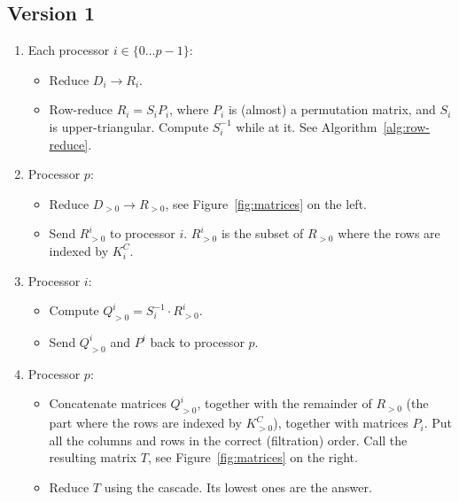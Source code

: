 \documentclass{article}
\begin{document}
\subsection{Version 1}
\begin{enumerate}
    \item
        Each processor $i \in \{ 0 \ldots p-1 \}$:
        \begin{itemize}
            \item Reduce        $D_i \to R_i$.
            \item Row-reduce    $R_i = S_i P_i$,
                where $P_i$ is (almost) a permutation matrix,
                and   $S_i$ is upper-triangular. Compute $S_i^{-1}$ while at it.
                See Algorithm~\ref{alg:row-reduce}.
        \end{itemize}
    \item
        Processor $p$:
        \begin{itemize}
            \item Reduce $D_{>0} \to R_{>0}$, see Figure~\ref{fig:matrices} on
                  the left.
            \item Send $R^i_{>0}$ to processor $i$.
                $R^i_{>0}$ is the subset of $R_{>0}$
                where the rows are indexed by $K^C_i$.
        \end{itemize}
    \item
        Processor $i$:
        \begin{itemize}
            \item Compute $Q^i_{>0} = S^{-1}_i \cdot R^i_{>0}$.
            \item Send $Q^i_{>0}$ and $P^i$ back to processor $p$.
        \end{itemize}
    \item
        Processor $p$:
        \begin{itemize}
            \item
                Concatenate matrices $Q^i_{>0}$, together with the remainder of
                $R_{>0}$ (the part where the rows are indexed by $K^C_{>0}$),
                together with matrices $P_i$.
                Put all the columns and rows in the correct (filtration) order.
                Call the resulting matrix $T$, see Figure~\ref{fig:matrices} on
                the right.
            \item Reduce $T$ using the cascade. Its lowest ones are the answer.
        \end{itemize}
\end{enumerate}
\end{document}

